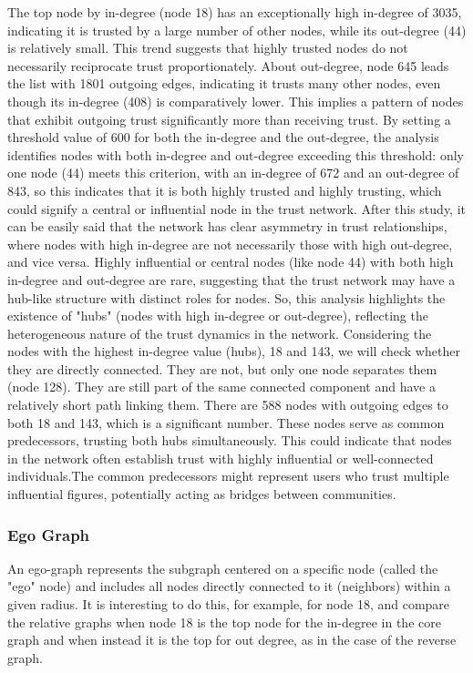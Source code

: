 \documentclass[conference]{IEEEtran}
\begin{document}
The top node by in-degree (node 18) has an exceptionally high in-degree of 3035, indicating it is trusted by a large number of other nodes, while its out-degree (44) is relatively small. This trend suggests that highly trusted nodes do not necessarily reciprocate trust proportionately. About out-degree, node 645 leads the list with 1801 outgoing edges, indicating it trusts many other nodes, even though its in-degree (408) is comparatively lower. This implies a pattern of nodes that exhibit outgoing trust significantly more than receiving trust. By setting a threshold value of 600 for both the in-degree and the out-degree, the analysis identifies nodes with both in-degree and out-degree exceeding this threshold: only one node (44) meets this criterion, with an in-degree of 672 and an out-degree of 843, so this indicates that it is both highly trusted and highly trusting, which could signify a central or influential node in the trust network. After this study, it can be easily said that the network has clear asymmetry in trust relationships, where nodes with high in-degree are not necessarily those with high out-degree, and vice versa. Highly influential or central nodes (like node 44) with both high in-degree and out-degree are rare, suggesting that the trust network may have a hub-like structure with distinct roles for nodes. So, this analysis highlights the existence of "hubs" (nodes with high in-degree or out-degree), reflecting the heterogeneous nature of the trust dynamics in the network.
Considering the nodes with the highest in-degree value (hubs), 18 and 143, we will check whether they are directly connected. They are not, but only one node separates them (node 128). They are still part of the same connected component and have a relatively short path linking them. There are 588 nodes with outgoing edges to both 18 and 143, which is a significant number. These nodes serve as common predecessors, trusting both hubs simultaneously. This could indicate that nodes in the network often establish trust with highly influential or well-connected individuals.The common predecessors might represent users who trust multiple influential figures, potentially acting as bridges between communities.


\subsubsection{Ego Graph}
An ego-graph represents the subgraph centered on a specific node (called the "ego" node) and includes all nodes directly connected to it (neighbors) within a given radius. It is interesting to do this, for example, for node 18, and compare the relative graphs when node 18 is the top node for the in-degree in the core graph and when instead it is the top for out degree, as in the case of the reverse graph.
\end{document}
